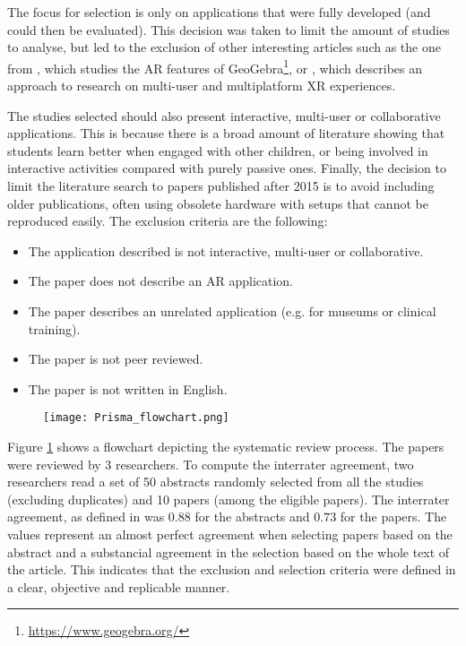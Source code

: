 The focus for selection is only on applications that were fully developed (and could then be evaluated). This decision was taken to limit the amount of studies to analyse, but led to the exclusion of other interesting articles such as the one from \cite{osypova2021improving}, which studies the AR features of GeoGebra\footnote{\url{https://www.geogebra.org/}}, or \citep{tumler2022multi}, which describes an approach to research on multi-user and multiplatform XR experiences.

The studies selected should also present interactive, multi-user or collaborative applications. This is because there is a broad amount of literature showing that students learn better when engaged with other children, or being involved in interactive activities compared with purely passive ones. Finally, the decision to limit the literature search to papers published after 2015 is to avoid including older publications, often using obsolete hardware with setups that cannot be reproduced easily. The exclusion criteria are the following:

\begin{itemize}
    \item The application described is not interactive, multi-user or collaborative.
    \item The paper does not describe an AR application.
    \item The paper describes an unrelated application (e.g. for museums or clinical training).
    \item The paper is not peer reviewed.
    \item The paper is not written in English.
\end{itemize}

\begin{figure}[ht!]	
	\begin{center}
	\texttt{[image: Prisma\_flowchart.png]}
	\captionsetup{font=small}
	\caption{\fontsize{10pt}{11pt}}
	\label{fig:flowchart}
    \end{center}
\end{figure}

Figure \ref{fig:flowchart} shows a flowchart depicting the systematic review process. The \papersToRead papers were reviewed by 3 researchers. To compute the interrater agreement, two researchers read a set of 50 abstracts randomly selected from all the studies (excluding duplicates) and 10 papers (among the \papersToRead eligible papers). The interrater agreement, as defined in \cite{cohen1960coefficient} was $0.88$ for the abstracts and $0.73$ for the papers. The values represent\citep{mchugh2012interrater} an almost perfect agreement when selecting papers based on the abstract and a substancial agreement in the selection based on the whole text of the article. This indicates that the exclusion and selection criteria were defined in a clear, objective and replicable manner.


